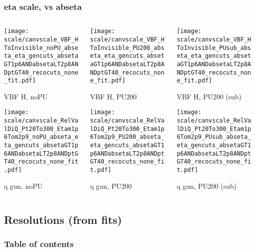 \documentclass[8pt]{beamer}
\begin{document}
  \begin{frame}
  \frametitle{eta scale, vs abseta}
  
  \begin{columns}
   \begin{column}{0.35\textwidth}
     \texttt{[image: scale/canvscale\_VBF\_HToInvisible\_noPU\_abseta\_eta\_gencuts\_absetaGT1p6ANDabsetaLT2p8ANDptGT40\_recocuts\_none\_fit.pdf]}
     
     VBF H, noPU
    
     \texttt{[image: scale/canvscale\_RelValDiQ\_Pt20To300\_Etam1p6Tom2p9\_noPU\_abseta\_eta\_gencuts\_absetaGT1p6ANDabsetaLT2p8ANDptGT40\_recocuts\_none\_fit.pdf]}
     
     q gun, noPU
   \end{column}
   \begin{column}{0.35\textwidth}
     \texttt{[image: scale/canvscale\_VBF\_HToInvisible\_PU200\_abseta\_eta\_gencuts\_absetaGT1p6ANDabsetaLT2p8ANDptGT40\_recocuts\_none\_fit.pdf]}
     
     VBF H, PU200
    
     \texttt{[image: scale/canvscale\_RelValDiQ\_Pt20To300\_Etam1p6Tom2p9\_PU200\_abseta\_eta\_gencuts\_absetaGT1p6ANDabsetaLT2p8ANDptGT40\_recocuts\_none\_fit.pdf]}
     
     q gun, PU200
   \end{column}
   \begin{column}{0.35\textwidth}
     \texttt{[image: scale/canvscale\_VBF\_HToInvisible\_PUsub\_abseta\_eta\_gencuts\_absetaGT1p6ANDabsetaLT2p8ANDptGT40\_recocuts\_none\_fit.pdf]}
     
     VBF H, PU200 (sub)
    
     \texttt{[image: scale/canvscale\_RelValDiQ\_Pt20To300\_Etam1p6Tom2p9\_PUsub\_abseta\_eta\_gencuts\_absetaGT1p6ANDabsetaLT2p8ANDptGT40\_recocuts\_none\_fit.pdf]}
     
     q gun, PU200 (sub)
   \end{column}
  \end{columns}
 \end{frame}
 
 \subsection{Resolutions (from fits)}

\begin{frame}
 \frametitle{Table of contents}
 
\end{frame}
 
\end{document}
